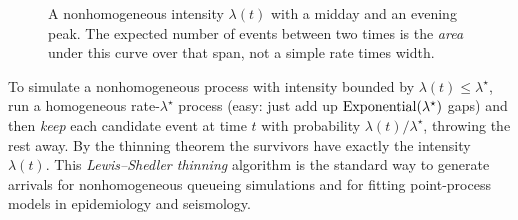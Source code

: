 \begin{figure}[H]
\centering
{}
\caption{A nonhomogeneous intensity $\lambda(t)$ with a midday and an evening
peak. The expected number of events between two times is the \emph{area} under
this curve over that span, not a simple rate times width.}
\label{ch25:fig-nonhomog}
\end{figure}

\begin{applicationbox}
To simulate a nonhomogeneous process with intensity bounded by
$\lambda(t)\le \lambda^\star$, run a homogeneous rate-$\lambda^\star$ process
(easy: just add up $\operatorname{Exponential}(\lambda^\star)$ gaps) and then \emph{keep} each
candidate event at time $t$ with probability $\lambda(t)/\lambda^\star$, throwing
the rest away. By the thinning theorem the survivors have exactly the intensity
$\lambda(t)$. This \emph{Lewis--Shedler thinning} algorithm is the standard way
to generate arrivals for nonhomogeneous queueing simulations and for fitting
point-process models in epidemiology and seismology.
\end{applicationbox}


